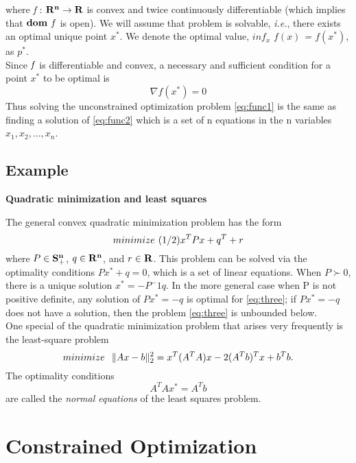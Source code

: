 \documentclass[twoside]{article}
\begin{document}
\begin{text}
        where {\it f } : ${\bf R^n} \rightarrow {\bf R}$ is convex and twice continuously differentiable (which implies that ${\bf dom }$ ${\it f}$ is open).
We will assume that problem is solvable, {\it i.e.}, there exists an optimal unique point $x^*$. We denote the optimal value, $inf_x$ \textit{$f(x)$ = $f(x^*)$}, as $p^*$.\\
        \hspace*{5mm} Since ${\it f}$ is differentiable and convex, a necessary and sufficient condition for a point $x^*$ to be optimal is
\begin{equation}\label{eq:func2}
    \nabla f(x^*) = 0 
\end{equation}
Thus solving  the unconstrained optimization problem \eqref{eq:func1} is the same as finding a solution of \eqref{eq:func2} which is a set of n equations in the n variables \(x_1,x_2,\ldots ,x_n\). 
\end{text}
\subsection{Example}
\textbf{ Quadratic minimization and least squares}\\
\begin{text}
The general convex quadratic minimization problem has the form
\begin{equation}\label{eq:three}
  minimize \hspace{0.05in}(1/2)x^{T}Px+q^{T}+r
\end{equation}
where \(P \in {\bf S_+^n}\), \(q \in {\bf R^n}\), and \(r \in {\bf R}\). This problem can be solved via the optimality conditions \(Px^* + q = 0\), which is a set of linear equations. When \(P \succ 0\), there is a unique solution \(x^* = -P^-1q\). In the more general case when P is not positive definite, any solution of \(Px^* = -q\) is optimal for \eqref{eq:three}; if \(Px^* = -q\) does not have a solution, then the problem \eqref{eq:three} is unbounded below.\\
\hspace*{5mm} One special of the quadratic minimization problem that arises very frequently is the least-square problem \[ minimize \hspace*{0.1in} \| Ax - b \|_2^2 = x^T(A^TA)x - 2(A^Tb)^Tx + b^Tb . \] The optimality conditions \[A^TAx^* = A^Tb\] are called the {\it normal equations} of the least squares problem.
\end{text}
\section{Constrained Optimization}
\end{document}
